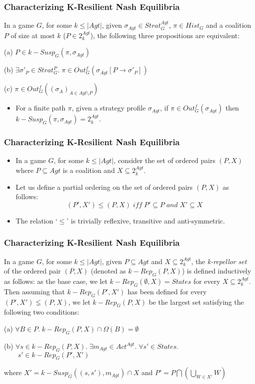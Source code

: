 \documentclass{beamer}
\begin{document}
\begin{frame}
\frametitle{Characterizing K-Resilient Nash Equilibria}
\begin{lemma}[1]
In a game $G$, for some $k \leq \vert Agt \vert$, given $\sigma_{Agt} \in Strat^{Agt}_{G}$, $\pi \in Hist_{G}$ and a coalition $P$ of size at most $k$ ($P \in 2^{Agt}_{k}$), the following three propositions are equivalent:

(a) $P \in k-Susp_{G}(\pi, \sigma_{Agt})$

(b) $\exists \sigma'_{P} \in Strat^{P}_{G}. \; \pi \in Out_{G}^{f}(\sigma_{Agt}[P \rightarrow \sigma'_{P}])$

(c) $\pi \in Out_{G}^{f}((\sigma_{A})_{A\in Agt\setminus P})$
\end{lemma}
\begin{itemize}
\item For a finite path $\pi$, given a strategy profile $\sigma_{Agt}$, if $\pi \in Out_{G}^{f}(\sigma_{Agt})$ then $k-Susp_{G}(\pi, \sigma_{Agt}) = 2^{Agt}_{k}$.
\end{itemize}
\end{frame}

\begin{frame}
\frametitle{Characterizing K-Resilient Nash Equilibria}
\begin{itemize}
\item In a game $G$, for some $k \leq \vert Agt \vert$, consider the set of ordered pairs $(P, X)$ where $P \subseteq Agt$ is a coalition and $X \subseteq 2^{Agt}_{k}$.
\item Let us define a partial ordering on the set of ordered pairs $(P, X)$ as follows:
\[(P', X') \leq (P, X) \; \textit{iff} \; P' \subseteq P \; \textit{and} \; X' \subseteq X\]
\item The relation `$\leq$' is trivially reflexive, transitive and anti-symmetric.
\end{itemize}
\end{frame}

\begin{frame}
\frametitle{Characterizing K-Resilient Nash Equilibria}
\begin{definition}
In a game $G$, for some $k \leq \vert Agt \vert$, given $P \subseteq Agt$ and $X \subseteq 2^{Agt}_{k}$, the \textit{k-repellor set} of the ordered pair $(P, X)$ (denoted as $k-Rep_{G}(P, X)$) is defined inductively as follows: as the base case, we let $k-Rep_{G}(\emptyset, X) = States$ for every $X \subseteq 2^{Agt}_{k}$. Then assuming that $k-Rep_{G}(P', X')$ has been defined for every $(P', X') \lneq (P, X)$, we let $k-Rep_{G}(P, X)$ be the largest set satisfying the following two conditions:

(a) $\forall B \in P. \; k-Rep_{G}(P, X) \cap \Omega(B) = \emptyset$

(b) $\forall s \in k-Rep_{G}(P, X). \; \exists m_{Agt} \in Act^{Agt}. \; \forall s' \in States.$\\$ \qquad s' \in k-Rep_{G}(P', X')$

where $X' = k-Susp_{G}((s, s'), m_{Agt}) \cap X$ and $P' = P \bigcap \left( \bigcup \limits_{W \in X'}W \right)$
\end{definition}
\end{frame}
\end{document}
